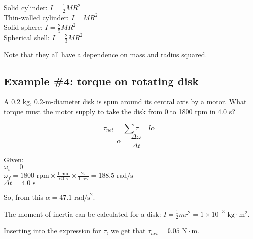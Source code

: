 Solid cylinder: $I=\frac{1}{2}MR^2$\\
Thin-walled cylinder: $I=MR^2$\\
Solid sphere: $I=\frac{2}{5}MR^2$\\
Spherical shell: $I=\frac{2}{3}MR^2$

Note that they all have a dependence on mass and radius squared.

\subsection{Example \#4: torque on rotating disk}
A 0.2 kg, 0.2-m-diameter disk is spun around its central axis by a motor. What torque must the motor supply to take the disk from 0 to 1800 rpm in 4.0 s?

$$\tau_{net}=\sum\tau=I\alpha$$
$$\alpha=\frac{\Delta\omega}{\Delta t}$$

Given:\\
$\omega_i=0$\\
$\omega_f=1800\mbox{ rpm}\times\frac{1\mbox{ min}}{60\mbox{ s}}\times\frac{2\pi}{1\mbox{ rev}}=188.5\mbox{ rad/s}$\\
$\Delta t=4.0\mbox{ s}$

So, from this $\boxed{\alpha=47.1\mbox{ rad/s}^2}$.

The moment of inertia can be calculated for a disk: $I=\frac{1}{2}mr^2=1\times 10^{-3}\mbox{ kg}\cdot\mbox{m}^2$.

Inserting into the expression for $\tau$, we get that $\boxed{\tau_{net}=0.05\mbox{ N}\cdot\mbox{m}}$.


\clearpage
